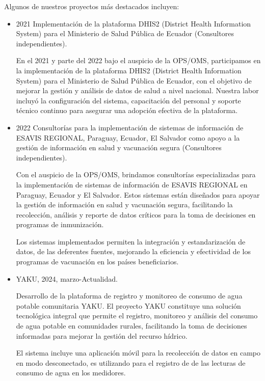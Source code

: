 Algunos de nuestros proyectos más destacados incluyen:
\begin{itemize}
    \item 2021 Implementación de la plataforma DHIS2 (District Health Information System) para el Ministerio de Salud Pública de Ecuador (Consultores independientes).
    
        En el 2021 y parte del 2022 bajo el auspicio de la OPS/OMS, participamos en la implementación de la plataforma DHIS2 (District Health Information System) para el Ministerio de Salud Pública de Ecuador, con el objetivo de mejorar la gestión y análisis de datos de salud a nivel nacional. Nuestra labor incluyó la configuración del sistema, capacitación del personal y soporte técnico continuo para asegurar una adopción efectiva de la plataforma.

    \item 2022 Consultorías para la implementación de sistemas de información de ESAVIS REGIONAL, Paraguay, Ecuador, El Salvador como apoyo a la gestión de información en salud y vacunación segura (Consultores independientes).
    
        Con el auspicio de la OPS/OMS, brindamos consultorías especializadas para la implementación de sistemas de información de ESAVIS REGIONAL en Paraguay, Ecuador y El Salvador. Estos sistemas están diseñados para apoyar la gestión de información en salud y vacunación segura, facilitando la recolección, análisis y reporte de datos críticos para la toma de decisiones en programas de inmunización.
        
        Los sistemas implementados permiten la integración y estandarización de datos, de las deferentes fuentes, mejorando la eficiencia y efectividad de los programas de vacunación en los países beneficiarios.
    
    \item YAKU, 2024, marzo-Actualidad.

        Desarrollo de la plataforma de registro y monitoreo de consumo de agua potable comunitaria YAKU. El proyecto YAKU constituye una solución tecnológica integral que permite el registro, monitoreo y análisis del consumo de agua potable en comunidades rurales, facilitando la toma de decisiones informadas para mejorar la gestión del recurso hídrico.

         El sistema incluye una aplicación móvil para la recolección de datos en campo en modo desconectado, es utilizando para el registro de de las lecturas de consumo de agua en los medidores. 


\end{itemize}
